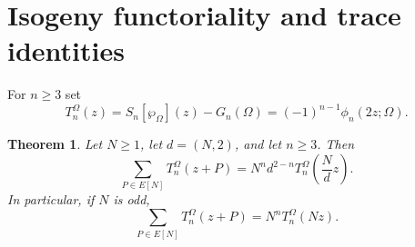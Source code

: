 \documentclass[11pt]{amsart}
\newtheorem{thm}{Theorem}[section]
\theoremstyle{definition}
\theoremstyle{remark}
\numberwithin{equation}{section}
\begin{document}
\section{Isogeny functoriality and trace identities}\label{sec:isogenies}

For $n\geq3$ set
\begin{equation}\label{eq:Tn}
T_n^\Omega(z)
=
S_n[\wp_\Omega](z)-G_n(\Omega)
=
(-1)^{n-1}\phi_n(2z;\Omega).
\end{equation}

\begin{thm}\label{thm:distribution}
Let $N\geq1$, let $d=(N,2)$, and let $n\geq3$. Then
\begin{equation}\label{eq:distribution}
\sum_{P\in E[N]}T_n^\Omega(z+P)
=
N^n d^{2-n}
T_n^\Omega\left(\frac Nd z\right).
\end{equation}
In particular, if $N$ is odd,
\begin{equation}\label{eq:distribution-odd}
\sum_{P\in E[N]}T_n^\Omega(z+P)
=
N^nT_n^\Omega(Nz).
\end{equation}
\end{thm}
\end{document}
